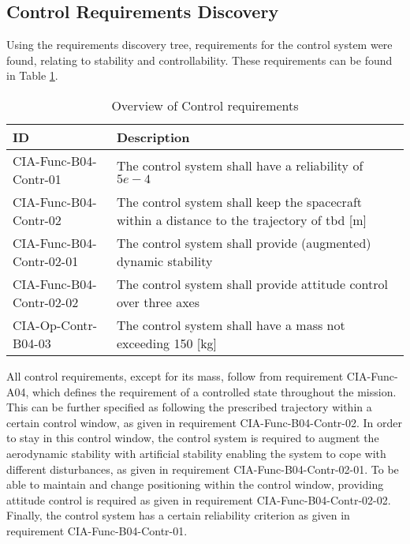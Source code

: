 \subsection{Control Requirements Discovery} \label{sec:req-control}
Using the requirements discovery tree, requirements for the control system were found, relating to stability and controllability. These requirements can be found in Table \ref{tab:controlreq}.

\begin{table}[H]
	\caption{Overview of Control requirements}
	\begin{tabular}{|p{}|p{}|}
		\hline
		ID         					&	Description																							\\ \hline \hline
		CIA-Func-B04-Contr-01		&	The control system shall have a reliability of $5e-4$            									\\ \hline
		CIA-Func-B04-Contr-02 		&	The control system shall keep the spacecraft within a distance to the trajectory of \gls{tbd} [m]	\\ \hline	
		CIA-Func-B04-Contr-02-01 	&	The control system shall provide (augmented) dynamic stability       								\\ \hline
		CIA-Func-B04-Contr-02-02 	&	The control system shall provide attitude control over three axes         							\\ \hline	
		CIA-Op-Contr-B04-03	&	The control system shall have a mass not exceeding 150 [kg]  							\\ \hline
	\end{tabular}
	\label{tab:controlreq}
\end{table}

All control requirements, except for its mass, follow from requirement CIA-Func-A04, which defines the requirement of a controlled state throughout the mission. 
This can be further specified as following the prescribed trajectory within a certain control window, as given in requirement CIA-Func-B04-Contr-02. 
In order to stay in this control window, the control system is required to augment the aerodynamic stability with artificial stability enabling the system to cope with different disturbances, as given in requirement CIA-Func-B04-Contr-02-01. 
To be able to maintain and change positioning within the control window, providing attitude control is required as given in requirement CIA-Func-B04-Contr-02-02. 
Finally, the control system has a certain reliability criterion as given in requirement CIA-Func-B04-Contr-01.